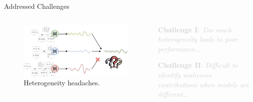 \begin{frame}{Addressed Challenges}
  
  \begin{columns}
    \begin{column}{.5\textwidth}
      \begin{figure}
        \centering
        \includegraphics[width=\linewidth]{figures/intro/heterogeneity.png}
        \caption{Heterogeneity headaches.}
      \end{figure}
    \end{column}

    \begin{column}{.5\textwidth}


      \textcolor<2->{lightgray}{%
      \textbf{Challenge I}: \textit{Too much heterogeneity leads to poor performance\dots}~
      }
      \vspace{1ex}


      \textcolor<1,3>{lightgray}{%
      \textbf{Challenge II}: \textit{Difficult to identify malicious contributions when models are different\dots}
      }
      
      \vspace{1ex}
      

\end{column}
\end{columns}
\end{frame}
